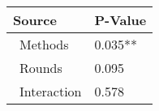
\centering
\begin{tabular}{ll}
\toprule
          Source & P-Value \\
\midrule
    \    Methods & 0.035** \\
     \    Rounds &   0.095 \\
\    Interaction &   0.578 \\
\bottomrule
\end{tabular}

